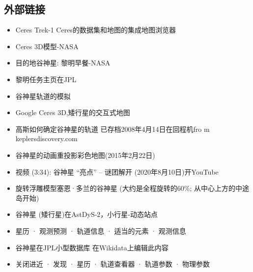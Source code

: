 \subsection{外部链接}
\begin{itemize}
\item Ceres Trek-1 Ceres的数据集和地图的集成地图浏览器
\item Ceres 3D模型-NASA
\item 目的地谷神星: 黎明早餐-NASA
\item 黎明任务主页在JPL
\item 谷神星轨道的模拟
\item Google Ceres 3D,矮行星的交互式地图
\item 高斯如何确定谷神星的轨道 已存档2008年4月14日在回程机fro m keplersdiscovery.com
\item 谷神星的动画重投影彩色地图(2015年2月22日)
\item 视频 (3:34): 谷神星 “亮点” -- 谜团解开 (2020年8月10日)开YouTube
\item 旋转浮雕模型塞恩·多兰的谷神星 (大约是全程旋转的60\%; 从中心上方的中途岛开始)
\item 谷神星 (矮行星)在AstDyS-2，小行星-动态站点
\item 星历 · 观测预测 · 轨道信息 · 适当的元素 · 观测信息
\item 谷神星在JPL小型数据库 在Wikidata上编辑此内容
\item 关闭进近 · 发现 · 星历 · 轨道查看器 · 轨道参数 · 物理参数
\end{itemize}